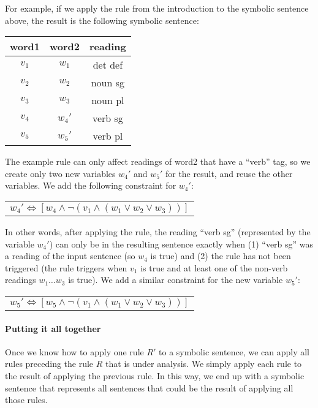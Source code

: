 For example, if we apply the rule from the introduction to the symbolic sentence above, the result is the following symbolic sentence:
\begin{center}
\begin{tabular}{c|c|c}
word1 & word2 & reading \\
\hline
$v_1$ & $w_1$ & det def \\
$v_2$ & $w_2$ & noun sg \\
$v_3$ & $w_3$ & noun pl \\
$v_4$ & $w_4'$ & verb sg \\
$v_5$ & $w_5'$ & verb pl \\
\end{tabular}
\end{center}
The example rule can only affect readings of word2 that have a ``verb'' tag, so we create only two new variables $w_4'$ and $w_5'$ for the result, and reuse the other variables. We add the following constraint for $w_4'$:
\begin{center}
\begin{tabular}{c}
$w_4' \Leftrightarrow [ w_4 \wedge \neg{}(v_1 \wedge (w_1 \vee w_2 \vee w_3)) ]$ \\
\end{tabular}
\end{center}
In other words, after applying the rule, the reading ``verb sg'' (represented by the variable $w_4'$) can only be in the resulting sentence exactly when (1) ``verb sg'' was a reading of the input sentence (so $w_4$ is true) and (2) the rule has not been triggered (the rule triggers when $v_1$ is true and at least one of the non-verb readings $w_1 \dots w_3$ is true). We add a similar constraint for the new variable $w_5'$:
\begin{center}
\begin{tabular}{c}
$w_5' \Leftrightarrow [ w_5 \wedge \neg{}(v_1 \wedge (w_1 \vee w_2 \vee w_3)) ]$ \\
\end{tabular}
\end{center}

\paragraph{Putting it all together}

Once we know how to apply one rule $R'$ to a symbolic sentence, we can apply all rules preceding the rule $R$ that is under analysis. We simply apply each rule to the result of applying the previous rule. In this way, we end up with a symbolic sentence that represents all sentences that could be the result of applying all those rules.

